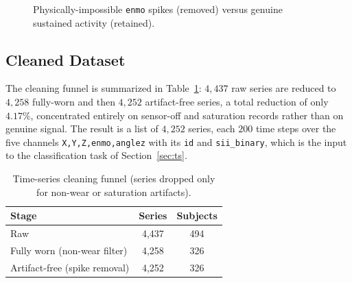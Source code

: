 \begin{figure}[h]
    \centering
    \caption{Physically-impossible \texttt{enmo} spikes (removed) versus genuine sustained activity (retained).}
    \label{fig:ts_spikes}
\end{figure}

\subsection{Cleaned Dataset}
The cleaning funnel is summarized in Table~\ref{tab:ts_funnel}: $4{,}437$ raw series are reduced to $4{,}258$ fully-worn and then $4{,}252$ artifact-free series, a total reduction of only $4.17\%$, concentrated entirely on sensor-off and saturation records rather than on genuine signal. The result is a list of $4{,}252$ series, each $200$ time steps over the five channels \texttt{X,Y,Z,enmo,anglez} with its \texttt{id} and \texttt{sii\_binary}, which is the input to the classification task of Section~\ref{sec:ts}.

\begin{table}[H]
\centering
\small
\caption{Time-series cleaning funnel (series dropped only for non-wear or saturation artifacts).}
\label{tab:ts_funnel}
\begin{tabular}{l c c}
\hline
Stage & Series & Subjects \\
\hline
Raw                            & 4{,}437 & 494 \\
Fully worn (non-wear filter)   & 4{,}258 & 326 \\
Artifact-free (spike removal)  & 4{,}252 & 326 \\
\hline
\end{tabular}
\end{table}

